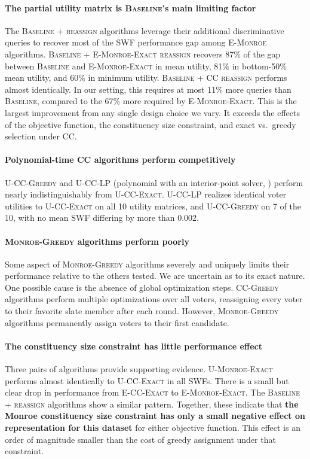\documentclass[letterpaper]{article} %
\newcommand{\Exact}{\textsc{U-CC-Exact}}
\newcommand{\Greedy}{\textsc{U-CC-Greedy}}
\newcommand{\LP}{\textsc{U-CC-LP}}
\newcommand{\ExactMonroe}{\textsc{U-Monroe-Exact}}
\newcommand{\EExactMonroe}{\textsc{E-Monroe-Exact}}
\newcommand{\Baseline}{\textsc{Baseline}}
\newcommand{\ECCExact}{\textsc{E-CC-Exact}}
\newcommand{\BaselineReassign}{\textsc{Baseline + reassign}}
\newcommand{\BaselineEMonroeReassign}{\textsc{Baseline + E-Monroe-Exact reassign}}
\newcommand{\BaselineCCReassign}{\textsc{Baseline + CC reassign}}
\begin{document}
\paragraph{The partial utility matrix is \Baseline's main limiting factor}
The \BaselineReassign{} algorithms leverage their additional discriminative queries to recover most of the SWF performance gap among \textsc{E-Monroe} algorithms.
\BaselineEMonroeReassign{} recovers 87\% of the gap between \Baseline{} and \EExactMonroe{} in mean utility, 81\% in bottom-50\% mean utility, and 60\% in minimum utility.
\BaselineCCReassign{} performs almost identically.
In our setting, this requires at most 11\% more queries than \Baseline, compared to the 67\% more required by \EExactMonroe{}.
This is the largest improvement from any single design choice we vary.
It exceeds the effects of the objective function, the constituency size constraint, and exact vs.\ greedy selection under CC.

\paragraph{Polynomial-time \textsc{CC} algorithms perform competitively}
\Greedy{} and \LP{} (polynomial with an interior-point solver, ) perform nearly indistinguishably from \Exact{}.
\LP{} realizes identical voter utilities to \Exact{} on all 10 utility matrices, and \Greedy{} on 7 of the 10, with no mean SWF differing by more than 0.002.

\paragraph{\textsc{Monroe-Greedy} algorithms perform poorly}
Some aspect of \textsc{Monroe-Greedy} algorithms severely and uniquely limits their performance relative to the others tested.
We are uncertain as to its exact nature.
One possible cause is the absence of global optimization steps.
\textsc{CC-Greedy} algorithms perform multiple optimizations over all voters, reassigning every voter to their favorite slate member after each round.
However, \textsc{Monroe-Greedy} algorithms permanently assign voters to their first candidate.

\paragraph{The constituency size constraint has little performance effect}
Three pairs of algorithms provide supporting evidence.
\ExactMonroe{} performs almost identically to \Exact{} in all SWFs.
There is a small but clear drop in performance from \ECCExact{} to \EExactMonroe{}.
The \BaselineReassign{} algorithms show a similar pattern.
Together, these indicate that \textbf{the Monroe constituency size constraint has only a small negative effect on representation for this dataset} for either objective function.
This effect is an order of magnitude smaller than the cost of greedy assignment under that constraint.
\end{document}
